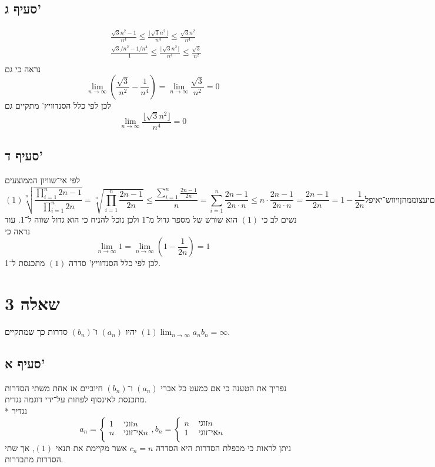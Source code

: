 \documentclass[a4paper]{article}
\begin{document}
\subsection{סעיף ג'}
\begin{align*}
	& \frac{\sqrt{3} n^2 - 1}{n^4} \le \frac{\lfloor \sqrt{3} n^2 \rfloor}{n^4} \le \frac{\sqrt{3} n^2}{n^4} \\
	& \frac{\sqrt{3}/n^2 - 1/n^4}{1} \le \frac{\lfloor \sqrt{3} n^2 \rfloor}{n^4} \le \frac{\sqrt{3}}{n^2} \\
\end{align*}
נראה כי גם
\[
	\lim_{n \to \infty} \left(\frac{\sqrt{3}}{n^2} - \frac{1}{n^4} \right)
	=
	\lim_{n \to \infty} \frac{\sqrt{3}}{n^2}
	= 0
\]
לכן לפי כלל הסנדוויץ' מתקיים גם
\[
	\lim_{n \to \infty} \frac{\lfloor \sqrt{3} n^2 \rfloor}{n^4} = 0
\]

\subsection{סעיף ד'}
לפי אי־שוויון הממוצעים
\[
	(1) \sqrt[n]{\frac{\displaystyle \prod_{i = 1}^{n} 2n - 1}{\displaystyle \prod_{i = 1}^{n} 2n }}
	= \sqrt[n]{\displaystyle \prod_{i = 1}^{n} \frac{2n - 1}{2n}}
	\le \frac{\displaystyle \sum_{i = 1}^{n} \frac{2n - 1}{2n}}{n}
	= \displaystyle \sum_{i = 1}^{n} \frac{2n - 1}{2n \cdot n}
	\le \displaystyle n \cdot \frac{2n - 1}{2n \cdot n}
	= \frac{2n - 1}{2n} 
	= 1 - \frac{1}{2n} 
לפי אי־שוויון הממוצעים
\]
נשים לב כי $(1)$ הוא שורש של מספר גדול מ־1 ולכן נוכל להניח כי הוא גדול שווה ל־1.
עוד נראה כי
\[
	\lim_{n \to \infty} 1 = \lim_{n \to \infty} \left( 1 - \frac{1}{2n} \right) = 1
\]
לכן לפי כלל הסנדוויץ' סדרה $(1)$ מתכנסת ל־1.

\section{שאלה 3}
יהיו $(a_n)$ ו־$(b_n)$ סדרות כך שמתקיים $(1) \lim_{n \to \infty} a_n b_n = \infty$.

\subsection{סעיף א'}
נפריך את הטענה כי אם כמעט כל אברי $(a_n)$ ו־$(b_n)$ חיוביים אז אחת משתי הסדרות מתכנסת לאינסוף לפחות על־ידי דוגמה נגדית. \\*
נגדיר
\[
	a_n = \begin{cases}
		1 & \text{ זוגי} n \\
		n & \text{ אי־זוגי} n \\
	\end{cases},
	b_n = \begin{cases}
		n & \text{ זוגי} n \\
		1 & \text{ אי־זוגי} n \\
	\end{cases}
\]
ניתן לראות כי מכפלת הסדרות היא הסדרה $c_n = n$ אשר מקיימת את תנאי $(1)$, אך שתי הסדרות מתבדרות.
\end{document}
